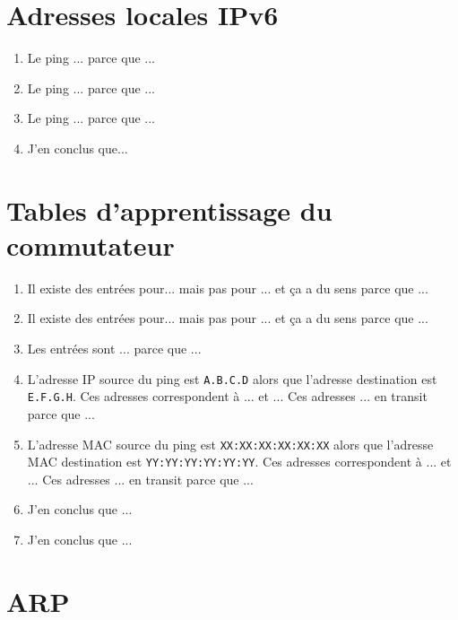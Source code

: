 \documentclass[]{article}
\begin{document}
\section*{Adresses locales IPv6}

\begin{enumerate}
    \item Le ping ... parce que ...
    \item Le ping ... parce que ...
    \item Le ping ... parce que ...
    \item J'en conclus que...
\end{enumerate}

\section*{Tables d'apprentissage du commutateur}

\begin{enumerate}
    \item Il existe des entrées pour... mais pas pour ... et ça a du sens parce que ...
    \item Il existe des entrées pour... mais pas pour ... et ça a du sens parce que ...
    \item Les entrées sont ... parce que ...

    \item L'adresse IP source du ping est \texttt{A.B.C.D} alors que l'adresse destination
          est \texttt{E.F.G.H}. Ces adresses correspondent à ... et ... Ces adresses ... en
          transit parce que ...
    \item L'adresse MAC source du ping est \texttt{XX:XX:XX:XX:XX:XX} alors que l'adresse
          MAC destination est \texttt{YY:YY:YY:YY:YY:YY}. Ces adresses correspondent à ... et ...
          Ces adresses ... en transit parce que ...
    \item J'en conclus que ...
    \item J'en conclus que ...
\end{enumerate}

\section*{ARP}
\end{document}
